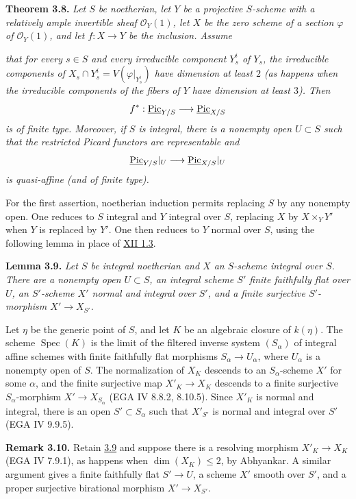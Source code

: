\textbf{Theorem 3.8.} \emph{Let \(S\) be noetherian, let \(Y\) be a
projective \(S\)-scheme with a relatively ample invertible sheaf
\(\mathcal O_Y(1)\), let \(X\) be the zero scheme of a section \(\varphi\)
of \(\mathcal O_Y(1)\), and let \(f:X\to Y\) be the inclusion. Assume}

\emph{that for every \(s\in S\) and every irreducible component \(Y_s^i\)
of \(Y_s\), the irreducible components of
\(X_s\cap Y_s^i=V(\varphi|_{Y_s^i})\) have dimension at least \(2\)
(as happens when the irreducible components of the fibers of \(Y\) have
dimension at least \(3\)). Then}
\[
f^*:\underline{\operatorname{Pic}}_{Y/S}\longrightarrow\underline{\operatorname{Pic}}_{X/S}
\]
\emph{is of finite type. Moreover, if \(S\) is integral, there is a
nonempty open \(U\subset S\) such that the restricted Picard functors
are representable and}
\[
\underline{\operatorname{Pic}}_{Y/S}|_U\longrightarrow\underline{\operatorname{Pic}}_{X/S}|_U
\]
\emph{is quasi-affine (and of finite type).}

For the first assertion, noetherian induction permits replacing \(S\) by
any nonempty open. One reduces to \(S\) integral and \(Y\) integral over
\(S\), replacing \(X\) by \(X\times_Y Y'\) when \(Y\) is replaced by
\(Y'\). One then reduces to \(Y\) normal over \(S\), using the following
lemma in place of \hyperlink{sga6.e12.lem.1-3}{XII 1.3}.

\textbf{Lemma 3.9.} \emph{Let \(S\) be integral noetherian and \(X\) an
\(S\)-scheme integral over \(S\). There are a nonempty open \(U\subset S\),
an integral scheme \(S'\) finite faithfully flat over \(U\), an
\(S'\)-scheme \(X'\) normal and integral over \(S'\), and a finite
surjective \(S'\)-morphism \(X'\to X_{S'}\).}

Let \(\eta\) be the generic point of \(S\), and let \(K\) be an algebraic
closure of \(k(\eta)\). The scheme \(\operatorname{Spec}(K)\) is the
limit of the filtered inverse system \((S_\alpha)\) of integral affine
schemes with finite faithfully flat morphisms
\(S_\alpha\to U_\alpha\), where \(U_\alpha\) is a nonempty open of \(S\).
The normalization of \(X_K\) descends to an \(S_\alpha\)-scheme \(X'\) for
some \(\alpha\), and the finite surjective map \(X'_K\to X_K\) descends
to a finite surjective \(S_\alpha\)-morphism \(X'\to X_{S_\alpha}\)
(EGA IV 8.8.2, 8.10.5). Since \(X'_K\) is normal and integral, there is
an open \(S'\subset S_\alpha\) such that \(X'_{S'}\) is normal and
integral over \(S'\) (EGA IV 9.9.5).

\textbf{Remark 3.10.} Retain \hyperlink{sga6.e13.lem.3-9}{3.9} and suppose there is a resolving
morphism \(X'_K\to X_K\) (EGA IV 7.9.1), as happens when
\(\dim(X_K)\le2\), by Abhyankar. A similar argument gives a finite
faithfully flat \(S'\to U\), a scheme \(X'\) smooth over \(S'\), and a
proper surjective birational morphism \(X'\to X_{S'}\).

